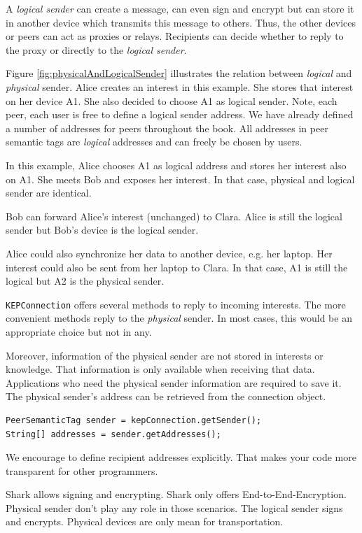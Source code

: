 A {\it logical sender} can create a message, can even sign and encrypt but can store it in another device which transmits this message to others. Thus, the other devices or peers can act as proxies or relays. Recipients can decide whether to reply to the proxy or directly to the {\it logical sender}. 

Figure \ref{fig:physicalAndLogicalSender} illustrates the relation between {\it logical} and {\it physical} sender. Alice creates an interest in this example. She stores that interest on her device A1. She also decided to choose A1 as logical sender. Note, each peer, each user is free to define a logical sender address. We have already defined a number of addresses for peers throughout the book. All addresses in peer semantic tags are {\it logical} addresses and can freely be chosen by users.

In this example, Alice chooses A1 as logical address and stores her interest also on A1. She meets Bob and exposes her interest. In that case, physical and logical sender are identical.

Bob can forward Alice's interest (unchanged) to Clara. Alice is still the logical sender but Bob's device is the logical sender. 

Alice could also synchronize her data to another device, e.g. her laptop. Her interest could also be sent from her laptop to Clara. In that case, A1 is still the logical but A2 is the physical sender.

{\tt KEPConnection} offers several methods to reply to incoming interests. The more convenient methods reply to the {\it physical} sender. In most cases, this would be an appropriate choice but not in any. 

Moreover, information of the physical sender are not stored in interests or knowledge. That information is only available when receiving that data.
Applications who need the physical sender information are required to save it.
The physical sender's address can be retrieved from the connection object.

\begin{verbatim}
PeerSemanticTag sender = kepConnection.getSender();
String[] addresses = sender.getAddresses();
\end{verbatim}

We encourage to define recipient addresses explicitly. That makes your code more transparent for other programmers.

Shark allows signing and encrypting. Shark only offers End-to-End-Encryption. Physical sender don't play any role in those scenarios. The logical sender signs and encrypts. Physical devices are only mean for transportation.

